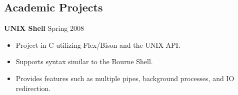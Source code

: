 \documentclass[10pt,line,margin,letterpaper]{res}
\begin{document}
\begin{resume}
\section {Academic Projects}

    {\bf UNIX Shell} \hfill Spring 2008
    \begin{itemize} \itemsep -2pt
    \item Project in C utilizing Flex/Bison and the UNIX API.
    \item Supports syntax similar to the Bourne Shell.
    \item Provides features such as multiple pipes, background processes, and IO redirection.
    \end{itemize}

\end{resume}
\end{document}
